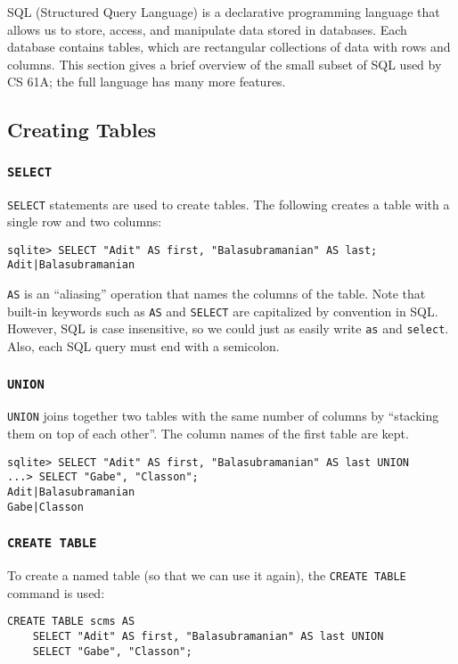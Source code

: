 SQL (Structured Query Language) is a declarative programming language that allows us to store, access, and manipulate data stored in databases.
Each database contains tables, which are rectangular collections of data with rows and columns. This section gives a brief overview of the small subset of SQL used by CS 61A; the full language has many more features. 

\subsection{Creating Tables}
\subsubsection{\lstinline{SELECT}}
\lstinline{SELECT} statements are used to create tables. The following creates a table with a single row and two columns: 
\begin{lstlisting}
sqlite> SELECT "Adit" AS first, "Balasubramanian" AS last;
Adit|Balasubramanian    
\end{lstlisting}

\lstinline{AS} is an ``aliasing'' operation that names the columns of the table. Note that built-in keywords such as \lstinline{AS} and \lstinline{SELECT} are capitalized by convention in SQL. However, SQL is case insensitive, so we could just as easily write \lstinline{as} and \lstinline{select}. Also, each SQL query must end with a semicolon. 

\subsubsection{\lstinline{UNION}}
\lstinline{UNION} joins together two tables with the same number of columns by ``stacking them on top of each other''. The column names of the first table are kept. 

\begin{lstlisting}
sqlite> SELECT "Adit" AS first, "Balasubramanian" AS last UNION
...> SELECT "Gabe", "Classon";
Adit|Balasubramanian
Gabe|Classon
\end{lstlisting}

\subsubsection{\lstinline{CREATE TABLE}}
To create a named table (so that we can use it again), the \lstinline{CREATE TABLE} command is used: 
\begin{lstlisting}
CREATE TABLE scms AS 
    SELECT "Adit" AS first, "Balasubramanian" AS last UNION
    SELECT "Gabe", "Classon";
\end{lstlisting}


